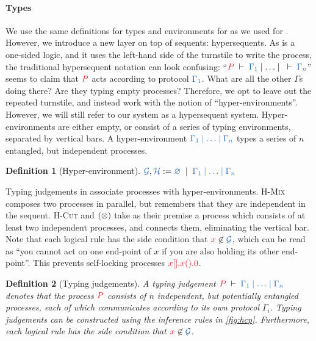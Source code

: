 \documentclass[draft,submission,copyright,creativecommons]{eptcs}
\newtheorem{definition}{Definition}
\begin{document}
\paragraph{Types}
We use the same definitions for types and environments for \hcp as we used for \cp. However, we introduce a new layer on top of sequents: hypersequents. As \cp is a one-sided logic, and it uses the left-hand side of the turnstile to write the process, the traditional hypersequent notation can look confusing: ``$\seq[P]{\Gamma_1}\hsep\dots\hsep\seq{\Gamma_n}$'' seems to claim that $\tm{P}$ acts according to protocol $\ty{\Gamma_1}$. What are all the other $\Gamma$s doing there? Are they typing empty processes? Therefore, we opt to leave out the repeated turnstile, and instead work with the notion of ``hyper-environments''. However, we will still refer to our system as a hypersequent system. Hyper-environments are either empty, or consist of a series of typing environments, separated by vertical bars. A hyper-environment $\ty{\Gamma_1 \hsep \dots \hsep \Gamma_n}$ types a series of $n$ entangled, but independent processes.
\begin{definition}[Hyper-environment]\label{def:hcp-hyper-environment}
  $\ty{\mathcal{G}}, \ty{\mathcal{H}} := \ty{\emptyhypercontext} \; \mid \; \ty{\Gamma_1 \hsep \dots \hsep \Gamma_n}$
\end{definition}\noindent
Typing judgements in \hcp associate processes with hyper-environments. \textsc{H-Mix} composes two processes in parallel, but remembers that they are independent in the sequent. \textsc{H-Cut} and $(\otimes)$ take as their premise a process which consists of at least two independent processes, and connects them, eliminating the vertical bar. Note that each logical rule has the side condition that $\tm{x} \not\in \ty{\mathcal{G}}$, which can be read as ``you cannot act on one end-point of $x$ if you are also holding its other end-point''. This prevents self-locking processes \eg $\tm{\piBoundSend{x}{}{\piRecv{x}{}{\piHalt}}}$.
\begin{definition}[Typing judgements]\label{def:hcp}
  A typing judgement $\seq[P]{\Gamma_1 \hsep \dots \hsep \Gamma_n}$ denotes that the process $\tm{P}$ consists of $n$ independent, but potentially entangled processes, each of which communicates according to its own protocol $\Gamma_i$. Typing judgements can be constructed using the inference rules in \cref{fig:hcp}. Furthermore, each logical rule has the side condition that $\tm{x} \not\in \ty{\mathcal{G}}$.
\end{definition}\noindent
\end{document}
